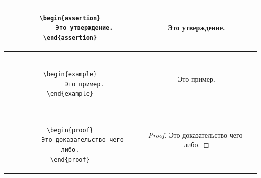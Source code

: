\begin{center}
\begin{tabular}{|c|c|}
\begin{minipage}{3in}
\begin{verbatim}
\begin{assertion}
        Это утверждение.
\end{assertion}
                \end{verbatim}
        \end{minipage}
        & 
        \begin{minipage}{3in}
                \begin{assertion}
                        Это утверждение.
                \end{assertion}
        \end{minipage}
\\ \hline
        \begin{minipage}{3in}
                \begin{verbatim}

\begin{example}
        Это пример.
\end{example}
                \end{verbatim}
        \end{minipage}
        & 
        \begin{minipage}{3in}
                \begin{example}
                        Это пример.
                \end{example}
        \end{minipage}
\\ \hline
        \begin{minipage}{3in}
                \begin{verbatim}

\begin{proof}
        Это доказательство чего-либо.
\end{proof}
                \end{verbatim}
        \end{minipage}
        & 
        \begin{minipage}{3in}
                \begin{proof}
                        Это доказательство чего-либо.
                \end{proof}
        \end{minipage}
\\ \hline
\end{tabular}
\end{center}

